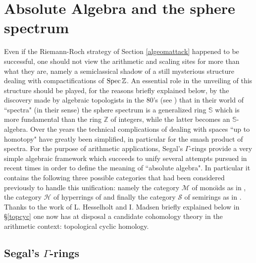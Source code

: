 \documentclass[12pt]{article}
\def\Spec{{\rm Spec\,}}
\def\Z{{\mathbb Z}}
\def\cH{{\mathcal H}}
\def\cM{{\mathcal M}}
\def\cS{{\mathcal S}}
\def\sss{{\mathbb  S}}
\begin{document}
\section{Absolute Algebra and the sphere spectrum}


Even if the Riemann-Roch strategy of Section \ref{algeomattack} happened to be successful, one should not view the arithmetic and scaling sites for more than what they are, namely a semiclassical shadow of a still mysterious structure dealing with compactifications of  $\Spec \Z$. An essential role in the unveiling of this structure should be played, for the reasons briefly explained below, by the discovery made by algebraic topologists in the 80's (see \cite{DGM}) that in their world of ``spectra" (in their sense) the sphere spectrum is a generalized ring $\sss$ which is more fundamental than the ring $\Z$ of integers, while 
the latter becomes an $\sss$-algebra. Over the years the technical complications of dealing with spaces ``up to homotopy" have greatly been simplified, in particular for the smash product of spectra. For the purpose of arithmetic applications, Segal's $\Gamma$-rings provide a very simple algebraic framework which succeeds to unify several attempts pursued in recent times in order to define the meaning of  ``absolute algebra".  In particular it contains the following three possible categories that had been considered previously to handle this unification: namely the category $\mathbf\cM$ of mono\"{\i}ds as in  \cite{deit, deit1,CC1,CC3}, the category $\mathbf\cH$ of hyperrings of \cite{CC2,CC4,CC5} and finally the category $\mathbf\cS$ of  semirings as in \cite{C,CC,CCas1,CCss}. Thanks to the work of L. Hesselholt and I. Madsen briefly explained below in \S \ref{topcyc} one now has at disposal a candidate cohomology theory in the arithmetic context: topological cyclic homology.




\subsection{Segal's $\Gamma$-rings}
\end{document}
